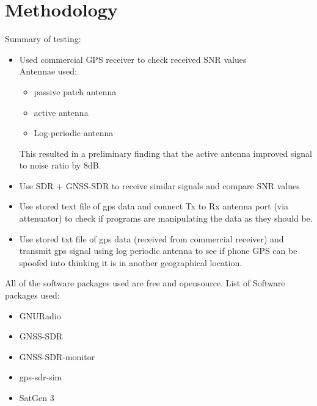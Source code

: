 \chapter{Methodology} %

\label{Chapter4} %
Summary of testing:
\begin{itemize}
    \item Used commercial GPS receiver to check received SNR values \\ Antennae used:
    \begin{itemize}
        \item passive patch antenna
        \item active antenna
        \item Log-periodic antenna
    \end{itemize}
    This resulted in a preliminary finding that the active antenna improved signal to noise ratio by 8dB. 
    \item Use SDR + GNSS-SDR to receive similar signals and compare SNR values
    \item Use stored text file of gps data and connect Tx to Rx antenna port (via attenuator) to check if programs are manipulating the data as they should be.
    \item Use stored txt file of gps data (received from commercial receiver) and transmit gps signal using log periodic antenna to see if phone GPS can be spoofed into thinking it is in another geographical location.
\end{itemize}
\medskip
All of the software packages used are free and opensource.
List of Software packages used:
\begin{itemize}
    \item GNURadio
    \item GNSS-SDR
    \item GNSS-SDR-monitor
    \item gps-sdr-sim
    \item SatGen 3
\end{itemize}

